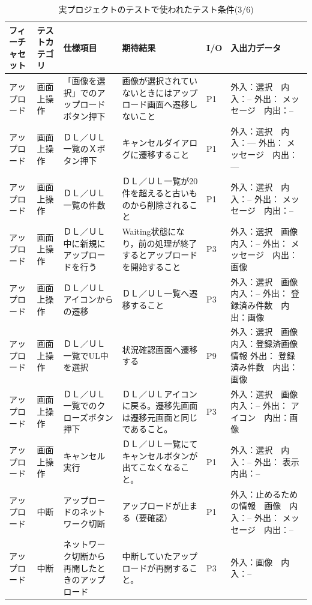 \begin{table}[htbp]
  \scriptsize
  \centering
  \caption{実プロジェクトのテストで使われたテスト条件(3/6)}
  \begin{tabular}{|p{8em}|p{7em}|p{9em}|p{9em}|p{3em}|p{12em}|}
\cline{1-6}   フィーチャセット & テストカテゴリ  & 仕様項目 & 期待結果  & I/O   & 入出力データ \bigstrut\\
    \hline
    \hline
    アップロード & 画面上操作 & 「画像を選択」でのアップロードボタン押下 & 画像が選択されていないときにはアップロード画面へ遷移しないこと & P1    & 外入：選択　内入：--
外出： メッセージ　内出：-- \bigstrut\\
    \hline
    アップロード & 画面上操作 & ＤＬ／ＵＬ一覧のＸボタン押下 & キャンセルダイアログに遷移すること & P1    & 外入：選択　内入：---
外出： メッセージ　内出：--- \bigstrut\\
    \hline
    アップロード & 画面上操作 & ＤＬ／ＵＬ一覧の件数 & ＤＬ／ＵＬ一覧が20件を超えると古いものから削除されること & P1    & 外入：選択　内入：--
外出： メッセージ　内出：-- \bigstrut\\
    \hline
    アップロード & 画面上操作 & ＤＬ／ＵＬ中に新規にアップロードを行う & Waiting状態になり，前の処理が終了するとアップロードを開始すること & P3    & 外入：選択　画像　内入：--
外出： メッセージ　内出：画像 \bigstrut\\
    \hline
    アップロード & 画面上操作 & ＤＬ／ＵＬアイコンからの遷移 & ＤＬ／ＵＬ一覧へ遷移すること & P3    & 外入：選択　画像　内入：--
外出： 登録済み件数　内出：画像 \bigstrut\\
    \hline
    アップロード & 画面上操作 & ＤＬ／ＵＬ一覧でUL中を選択 & 状況確認画面へ遷移する & P9    & 外入：選択　画像　内入：登録済画像情報
外出： 登録済み件数　内出：画像 \bigstrut\\
    \hline
    アップロード & 画面上操作 & ＤＬ／ＵＬ一覧でのクローズボタン押下 & ＤＬ／ＵＬアイコンに戻る。遷移先画面は遷移元画面と同じであること。 & P3    & 外入：選択　画像　内入：--
外出： アイコン　内出：画像 \bigstrut\\
    \hline
    アップロード & 画面上操作 & キャンセル実行 & ＤＬ／ＵＬ一覧にてキャンセルボタンが出てこなくなること。 & P1    & 外入：選択　内入：--
外出： 表示　内出：-- \bigstrut\\
    \hline
    アップロード & 中断    & アップロードのネットワーク切断 & アップロードが止まる（要確認） & P1    & 外入：止めるための情報　画像　内入：--
外出： メッセージ　内出：-- \bigstrut\\
    \hline
    アップロード & 中断    & ネットワーク切断から再開したときのアップロード & 中断していたアップロードが再開すること。 & P3    & 外入：画像　内入：--

\end{tabular}
\end{table}
